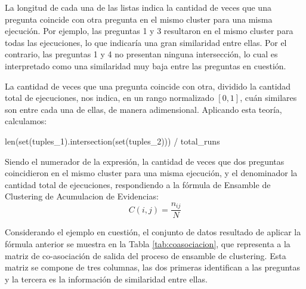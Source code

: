 La longitud de cada una de las listas indica la cantidad de veces que una pregunta coincide con otra pregunta en el mismo cluster para una misma ejecución. Por ejemplo, las preguntas 1 y 3 resultaron en el mismo cluster para todas las ejecuciones, lo que indicaría una gran similaridad entre ellas. Por el contrario, las preguntas 1 y 4 no presentan ninguna intersección, lo cual es interpretado como una similaridad muy baja entre las preguntas en cuestión.

\bigskip La cantidad de veces que una pregunta coincide con otra, dividido la cantidad total de ejecuciones, nos indica, en un rango normalizado \([0,1]\), cuán similares son entre cada una de ellas, de manera adimensional. Aplicando esta teoría, calculamos:

\begin{python}
len(set(tuples_1).intersection(set(tuples_2))) / total_runs
\end{python}

Siendo el numerador de la expresión, la cantidad de veces que dos preguntas coincidieron en el mismo cluster para una misma ejecución, y el denominador la cantidad total de ejecuciones, respondiendo a la fórmula de Ensamble de Clustering de Acumulacion de Evidencias:
\[C(i,j)=\frac{n_{ij}}{N}\]

\bigskip Considerando el ejemplo en cuestión, el conjunto de datos resultado de aplicar la fórmula anterior se muestra en la Tabla \ref{tab:coasociacion}, que representa a la matriz de co-asociación de salida del proceso de ensamble de clustering. Esta matriz se compone de tres columnas, las dos primeras identifican a las preguntas y la tercera es la información de similaridad entre ellas.

